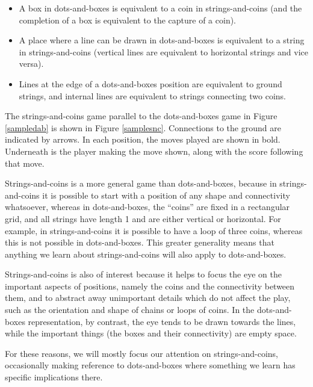 \documentclass[a4paper,twocolumn]{article}
\begin{document}
\begin{itemize}
\item A box in dots-and-boxes is equivalent to a coin in
  strings-and-coins (and the completion of a box is equivalent to the
  capture of a coin).
\item A place where a line can be drawn in dots-and-boxes is
  equivalent to a string in strings-and-coins (vertical lines are
  equivalent to horizontal strings and vice versa).
\item Lines at the edge of a dots-and-boxes position are equivalent to
  ground strings, and internal lines are equivalent to strings
  connecting two coins.
\end{itemize}

The strings-and-coins game parallel to the dots-and-boxes game in
Figure \ref{sampledab} is shown in Figure \ref{samplesnc}. Connections
to the ground are indicated by arrows. In each position, the moves
played are shown in bold. Underneath is the player making the move
shown, along with the score following that move.

\begin{figure*}
  \centering
  \def\svgscale{0.7}
  
  \caption{Sample strings-and-coins game equivalent to Figure \ref{sampledab}}
  \label{samplesnc}
\end{figure*}

Strings-and-coins is a more general game than dots-and-boxes, because
in strings-and-coins it is possible to start with a position of any
shape and connectivity whatsoever, whereas in dots-and-boxes, the
``coins'' are fixed in a rectangular grid, and all strings have length
1 and are either vertical or horizontal. For example, in
strings-and-coins it is possible to have a loop of three coins,
whereas this is not possible in dots-and-boxes. This greater
generality means that anything we learn about strings-and-coins will
also apply to dots-and-boxes.

Strings-and-coins is also of interest because it helps to focus the
eye on the important aspects of positions, namely the coins and the
connectivity between them, and to abstract away unimportant details
which do not affect the play, such as the orientation and shape of
chains or loops of coins. In the dots-and-boxes representation, by
contrast, the eye tends to be drawn towards the lines, while the
important things (the boxes and their connectivity) are empty space.

For these reasons, we will mostly focus our attention on
strings-and-coins, occasionally making reference to dots-and-boxes
where something we learn has specific implications there.
\end{document}
